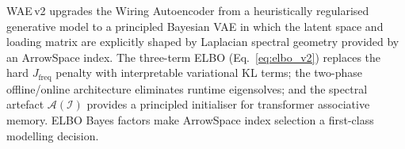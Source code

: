 \documentclass[11pt,a4paper]{article}
\newcommand{\I}{\mathcal{I}}
\newcommand{\A}{\mathcal{A}}
\begin{document}
WAE\,v2 upgrades the Wiring Autoencoder from a heuristically regularised
generative model to a principled Bayesian VAE in which the latent space and
loading matrix are explicitly shaped by Laplacian spectral geometry provided by
an ArrowSpace index.  The three-term ELBO (Eq.~\ref{eq:elbo_v2}) replaces the
hard $J_{\mathrm{freq}}$ penalty with interpretable variational KL terms; the
two-phase offline/online architecture eliminates runtime eigensolves; and the
spectral artefact $\A(\I)$ provides a principled initialiser for transformer
associative memory.  ELBO Bayes factors make ArrowSpace index selection a
first-class modelling decision.



\end{document}
